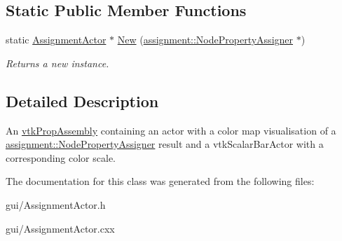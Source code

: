 \subsection*{Static Public Member Functions}
\begin{DoxyCompactItemize}
\item 
\hypertarget{classgui_1_1_assignment_actor_a550454472b7e6f8d4abc8470641e8090}{
static \hyperlink{classgui_1_1_assignment_actor}{AssignmentActor} $\ast$ \hyperlink{classgui_1_1_assignment_actor_a550454472b7e6f8d4abc8470641e8090}{New} (\hyperlink{classassignment_1_1_node_property_assigner}{assignment::NodePropertyAssigner} $\ast$)}
\label{classgui_1_1_assignment_actor_a550454472b7e6f8d4abc8470641e8090}

\begin{DoxyCompactList}\small\item\em Returns a new instance. \item\end{DoxyCompactList}\end{DoxyCompactItemize}


\subsection{Detailed Description}
An \hyperlink{classvtk_prop_assembly}{vtkPropAssembly} containing an actor with a color map visualisation of a \hyperlink{classassignment_1_1_node_property_assigner}{assignment::NodePropertyAssigner} result and a vtkScalarBarActor with a corresponding color scale. 

The documentation for this class was generated from the following files:\begin{DoxyCompactItemize}
\item 
gui/AssignmentActor.h\item 
gui/AssignmentActor.cxx\end{DoxyCompactItemize}
